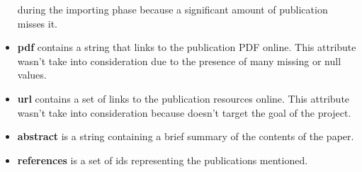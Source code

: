 \documentclass{Configuration_Files/PoliMi3i_thesis}
\begin{document}
\begin{itemize}
                    during the importing phase because a significant amount of publication misses it.
    \item \textbf{pdf} contains a string that links to the publication PDF online. This attribute wasn't take into
            consideration due to the presence of many missing or null values.
    \item \textbf{url} contains a set of links to the publication resources online. This attribute wasn't take into
            consideration because doesn't target the goal of the project.
    \item \textbf{abstract} is a string containing a brief summary of the contents of the paper.
    \item \textbf{references} is a set of ids representing the publications mentioned.
\end{itemize}
\bigskip
\end{document}
